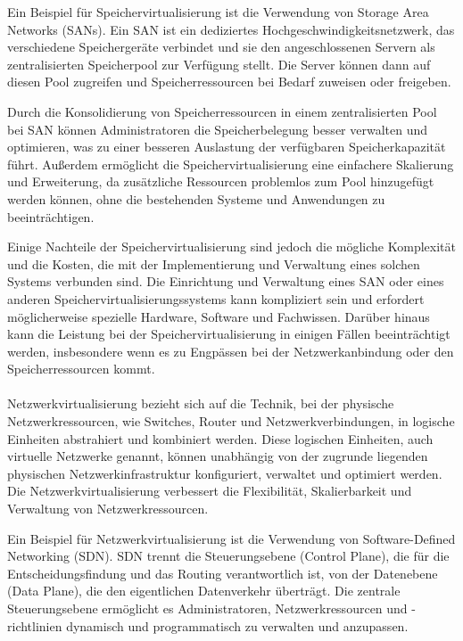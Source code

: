 Ein Beispiel für Speichervirtualisierung ist die Verwendung von Storage Area Networks (SANs). Ein SAN ist ein dediziertes Hochgeschwindigkeitsnetzwerk, das verschiedene Speichergeräte verbindet und sie den angeschlossenen Servern als zentralisierten Speicherpool zur Verfügung stellt. Die Server können dann auf diesen Pool zugreifen und Speicherressourcen bei Bedarf zuweisen oder freigeben.

Durch die Konsolidierung von Speicherressourcen in einem zentralisierten Pool bei SAN können Administratoren die Speicherbelegung besser verwalten und optimieren, was zu einer besseren Auslastung der verfügbaren Speicherkapazität führt. Außerdem ermöglicht die Speichervirtualisierung eine einfachere Skalierung und Erweiterung, da zusätzliche Ressourcen problemlos zum Pool hinzugefügt werden können, ohne die bestehenden Systeme und Anwendungen zu beeinträchtigen.

Einige Nachteile der Speichervirtualisierung sind jedoch die mögliche Komplexität und die Kosten, die mit der Implementierung und Verwaltung eines solchen Systems verbunden sind. Die Einrichtung und Verwaltung eines SAN oder eines anderen Speichervirtualisierungssystems kann kompliziert sein und erfordert möglicherweise spezielle Hardware, Software und Fachwissen. Darüber hinaus kann die Leistung bei der Speichervirtualisierung in einigen Fällen beeinträchtigt werden, insbesondere wenn es zu Engpässen bei der Netzwerkanbindung oder den Speicherressourcen kommt.
\\\\
Netzwerkvirtualisierung bezieht sich auf die Technik, bei der physische Netzwerkressourcen, wie Switches, Router und Netzwerkverbindungen, in logische Einheiten abstrahiert und kombiniert werden. Diese logischen Einheiten, auch virtuelle Netzwerke genannt, können unabhängig von der zugrunde liegenden physischen Netzwerkinfrastruktur konfiguriert, verwaltet und optimiert werden. Die Netzwerkvirtualisierung verbessert die Flexibilität, Skalierbarkeit und Verwaltung von Netzwerkressourcen.

Ein Beispiel für Netzwerkvirtualisierung ist die Verwendung von Software-Defined Networking (SDN). SDN trennt die Steuerungsebene (Control Plane), die für die Entscheidungsfindung und das Routing verantwortlich ist, von der Datenebene (Data Plane), die den eigentlichen Datenverkehr überträgt. Die zentrale Steuerungsebene ermöglicht es Administratoren, Netzwerkressourcen und -richtlinien dynamisch und programmatisch zu verwalten und anzupassen.

